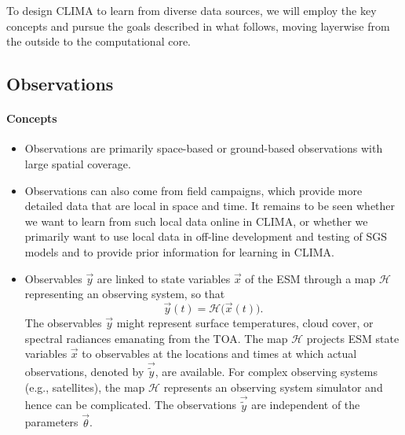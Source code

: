 \documentclass{article}
\begin{document}
To design CLIMA to learn from diverse data sources, we will employ the key concepts and pursue the goals described in what follows, moving layerwise from the outside to the computational core.

\subsection{Observations}

\paragraph{Concepts}
\begin{itemize}
    \item Observations are primarily space-based or ground-based observations with large spatial coverage.
    \item Observations can also come from field campaigns, which provide more detailed data that are local in space and time. It remains to be seen whether we want to learn from such local data online in CLIMA, or whether we primarily want to use local data in off-line development and testing of SGS models and to provide prior information for learning in CLIMA.
    \item Observables $\vec{y}$ are linked to state variables $\vec{x}$ of the ESM through a map $\mathcal{H}$ representing an observing system, so that 
    \begin{equation}
    \vec{y}(t)=\mathcal{H}\bigl(\vec{x}(t)\bigr).
    \end{equation}
    The observables $\vec{y}$ might represent surface temperatures, cloud cover, or spectral radiances emanating from the TOA. The map $\mathcal{H}$ projects ESM state variables $\vec{x}$ to observables at the locations and times at which actual observations, denoted by $\vec{\tilde y}$, are available. For complex observing systems (e.g., satellites), the map $\mathcal{H}$ represents an observing system simulator and hence can be complicated. The observations $\vec{\tilde y}$ are independent of the parameters $\vec{\theta}$.
\end{itemize}
\end{document}
